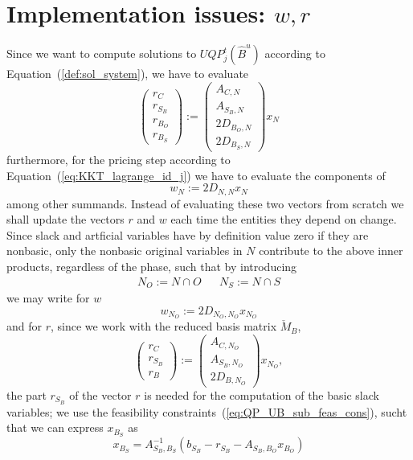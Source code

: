 \documentclass[a4paper]{article}
\begin{document}
\section{Implementation issues: $w,r$}
Since we want to compute solutions to $UQP_{j}^{t}(\hat{B}^{u})$
according to Equation~(\ref{def:sol_system}),
we have to evaluate 
\begin{equation}
\left(
\begin{array}{c}
r_{C} \\
\hline
r_{S_{B}} \\
\hline
r_{B_{O}} \\
\hline
r_{B_{S}}
\end{array}
\right)
:=
\left(
\begin{array}{c}
A_{C, N} \\
\hline
A_{S_{B}, N} \\
\hline
2D_{B_{O}, N} \\
\hline
2D_{B_{S}, N}
\end{array}
\right)
x_{N}
\end{equation}
furthermore, for the pricing step according to
Equation~(\ref{eq:KKT_lagrange_id_j}) we have to evaluate the components of
\begin{equation}
w_{N}:=2D_{N, N}x_{N}
\end{equation}
among other summands.
Instead of evaluating these two vectors from scratch we shall update
the vectors $r$ and $w$ each time the entities they depend on change.
Since slack and artficial variables have by definition
value zero if they are nonbasic,
only the nonbasic original variables in $N$ contribute to the above
inner products, regardless of the phase, such that by introducing
\begin{eqnarray}
N_{O}:=N \cap O && N_{S}:=N \cap S
\end{eqnarray} 
we may write for $w$
\begin{equation}
w_{N_{O}}:=2D_{N_{O} , N_{O}}x_{N_{O}}
\end{equation}
and for $r$, since we work with the reduced basis matrix
$\check{M}_{B}$,
\begin{equation}
\left(
\begin{array}{c}
r_{C} \\
\hline
r_{S_{B}} \\
\hline
r_{B}
\end{array}
\right)
:=
\left(
\begin{array}{c}
A_{C, N_{O}} \\
\hline
A_{S_{B}, N_{O}} \\
\hline
2D_{B, N_{O}}
\end{array}
\right)
x_{N_{O}},
\end{equation}
the part $r_{S_{B}}$ of the vector $r$ is needed for the computation of the
basic slack variables; we use the feasibility
constraints~(\ref{eq:QP_UB_sub_feas_cons}), sucht that we can express
$x_{B_{S}}$ as
\begin{equation}
x_{B_{S}}
=
A_{S_{B}, B_{S}}^{-1}\left(b_{S_{B}}-r_{S_{B}}-A_{S_{B}, B_{O}}x_{B_{O}}\right)
\end{equation}
\end{document}
